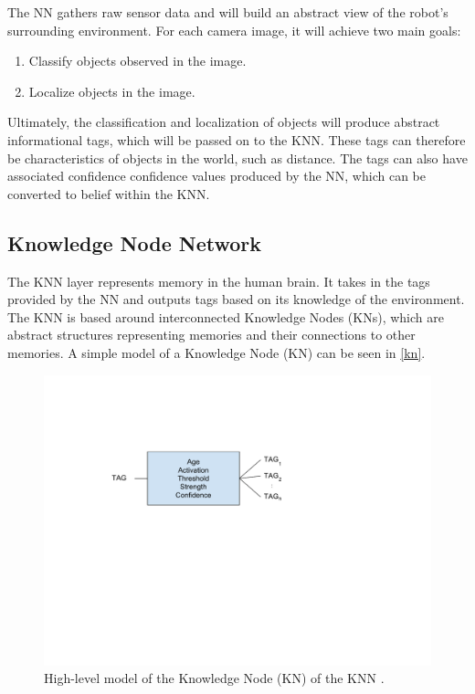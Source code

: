 \documentclass[titlepage,11pt]{article}
\newcommand{\ar}[1]{\autoref{#1}}
\begin{document}
The NN gathers raw sensor data and will build an abstract view of the robot's surrounding environment. For each camera image, it will achieve two main goals:

\begin{enumerate}
	\item Classify objects observed in the image.
	\item Localize objects in the image.
\end{enumerate}

Ultimately, the classification and localization of objects will produce abstract informational tags, which will be passed on to the KNN. These tags can therefore be characteristics of objects in the world, such as distance. The tags can also have associated confidence confidence values produced by the NN, which can be converted to belief within the KNN.

\subsection{Knowledge Node Network}

The KNN layer represents memory in the human brain. It takes in the tags provided by the NN and outputs tags based on its knowledge of the environment. The KNN is based around interconnected Knowledge Nodes (KNs), which are abstract structures representing memories and their connections to other memories. A simple model of a Knowledge Node (KN) can be seen in \ar{kn}.

\begin{figure}[!htb]
	\includegraphics[width=\columnwidth]{figures/kn.pdf}
	\caption[High-level model of the Knowledge Node of the KNN.]
	{High-level model of the Knowledge Node (KN) of the KNN \cite{vybihal-knowledge}.}
	\label{kn}
\end{figure}
\end{document}

